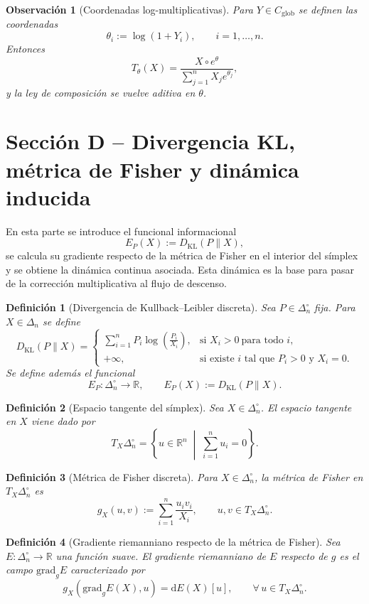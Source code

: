 ﻿\documentclass[12pt]{article}
\newtheorem{definicion}{Definición}[section]
\newtheorem{observacion}{Observación}[section]
\begin{document}
\begin{observacion}[Coordenadas log-multiplicativas]\label{obs:coordenadasLog}
Para $Y\in C_{\mathrm{glob}}$ se definen las coordenadas
\[
\theta_i:=\log(1+Y_i),\qquad i=1,\dots,n.
\]
Entonces
\[
T_\theta(X)=\frac{X\circ e^\theta}{\sum_{j=1}^n X_j e^{\theta_j}},
\]
y la ley de composición se vuelve aditiva en $\theta$.
\end{observacion}

\section{Sección D -- Divergencia KL, métrica de Fisher y dinámica inducida}

En esta parte se introduce el funcional informacional
\[
E_P(X):=D_{\mathrm{KL}}(P\|X),
\]
se calcula su gradiente respecto de la métrica de Fisher en el interior del símplex y se obtiene la dinámica continua asociada. Esta dinámica es la base para pasar de la corrección multiplicativa al flujo de descenso.

\begin{definicion}[Divergencia de Kullback--Leibler discreta]\label{def:KL}
Sea $P\in\Delta_n^\circ$ fija. Para $X\in\Delta_n$ se define
\[
D_{\mathrm{KL}}(P\|X)
=
\begin{cases}
\displaystyle \sum_{i=1}^n P_i\log\!\left(\frac{P_i}{X_i}\right), & \text{si } X_i>0\ \text{para todo } i,\\[1em]
+\infty, & \text{si existe } i \text{ tal que } P_i>0 \text{ y } X_i=0.
\end{cases}
\]
Se define además el funcional
\[
E_P:\Delta_n^\circ\to\mathbb R,\qquad
E_P(X):=D_{\mathrm{KL}}(P\|X).
\]
\end{definicion}

\begin{definicion}[Espacio tangente del símplex]\label{def:tangente}
Sea $X\in\Delta_n^\circ$. El espacio tangente en $X$ viene dado por
\[
T_X\Delta_n^\circ
=
\left\{
u\in\mathbb R^n
\;\middle|\;
\sum_{i=1}^n u_i=0
\right\}.
\]
\end{definicion}

\begin{definicion}[Métrica de Fisher discreta]\label{def:Fisher}
Para $X\in\Delta_n^\circ$, la métrica de Fisher en $T_X\Delta_n^\circ$ es
\[
g_X(u,v):=\sum_{i=1}^n \frac{u_i v_i}{X_i},\qquad u,v\in T_X\Delta_n^\circ.
\]
\end{definicion}

\begin{definicion}[Gradiente riemanniano respecto de la métrica de Fisher]\label{def:gradienteFisher}
Sea $E:\Delta_n^\circ\to\mathbb R$ una función suave. El gradiente riemanniano de $E$ respecto de $g$ es el campo $\mathrm{grad}_gE$ caracterizado por
\[
g_X(\mathrm{grad}_gE(X),u)=\mathrm dE(X)[u],
\qquad
\forall\,u\in T_X\Delta_n^\circ.
\]
\end{definicion}
\end{document}
